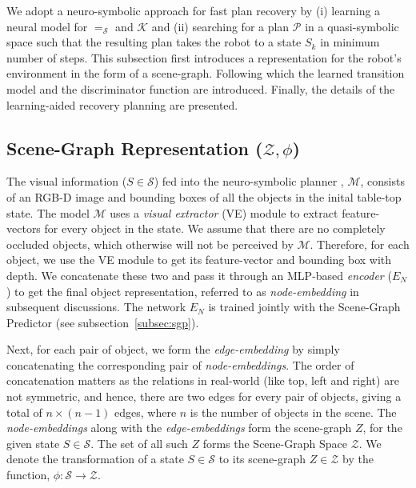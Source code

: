 \label{sec:approach}
%
We adopt a neuro-symbolic approach for fast plan recovery by (i) learning a neural model for  $=_\mathcal{S}$ and $\mathcal{K}$ and (ii) searching for a plan $\mathcal{P}$ in a quasi-symbolic space such that the resulting plan takes the robot to a state $S_k$ in minimum number of steps. This subsection first introduces a representation for the robot's environment in the form of a scene-graph. Following which the learned transition model and the discriminator function are introduced. Finally, the details of the learning-aided recovery planning are presented. 

\subsection{Scene-Graph Representation ($\mathcal{Z}, \phi$)}
\label{subsec:sgs}
The visual information ($S \in \mathcal{S}$) fed into the neuro-symbolic planner \cite{Kalithasan2022LearningNP}, $\mathcal{M}$, consists of an RGB-D image and bounding boxes of all the objects in the inital table-top state. The model $\mathcal{M}$ uses a \textit{visual extractor} (VE) module to extract feature-vectors for every object in the state. We assume that there are no completely occluded objects, which otherwise will not be perceived by $\mathcal{M}$. Therefore, for each object, we use the VE module to get its feature-vector and bounding box with depth. We concatenate these two and pass it through an MLP-based \textit{encoder} ($E_N$) to get the final object representation, referred to as \textit{node-embedding} in subsequent discussions. The network $E_N$ is trained jointly with the Scene-Graph Predictor (see subsection~\ref{subsec:sgp}).

Next, for each pair of object, we form the \textit{edge-embedding} by simply concatenating the corresponding pair of \textit{node-embeddings}. The order of concatenation matters as the relations in real-world (like top, left and right) are not symmetric, and hence, there are two edges for every pair of objects, giving a total of $n \times (n - 1)$ edges, where $n$ is the number of objects in the scene. The \textit{node-embeddings} along with the \textit{edge-embeddings} form the scene-graph $Z$, for the given state $S \in \mathcal{S}$. The set of all such $Z$ forms the Scene-Graph Space $\mathcal{Z}$.
%
We denote the transformation of a state $S \in \mathcal{S}$ to its scene-graph $Z \in \mathcal{Z}$ by the function, $\phi: \mathcal{S} \rightarrow \mathcal{Z}$. 

